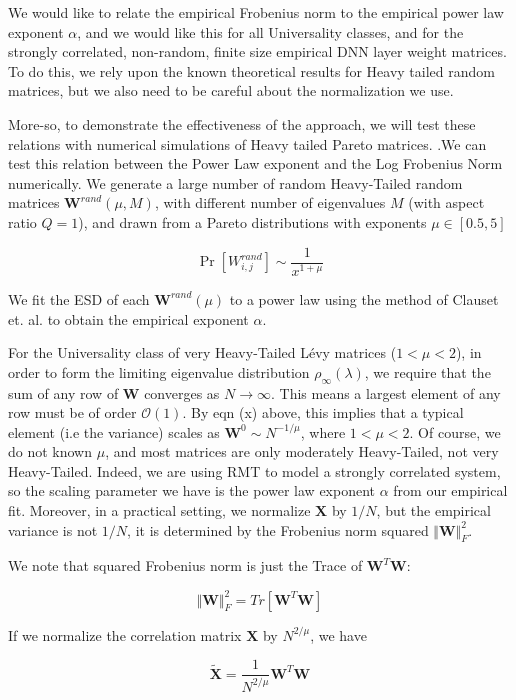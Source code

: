 We would like to relate the empirical Frobenius norm to the empirical power law exponent $\alpha$, and we would like this for all Universality classes,
and for the strongly correlated,  non-random, finite size empirical DNN layer weight matrices.  To do this, we rely upon the known theoretical
results for Heavy tailed random matrices, but we also need to be careful about the normalization we use.

More-so, to demonstrate the effectiveness of the approach, we will test these relations with numerical simulations of Heavy tailed Pareto matrices.
.We can test this relation between the Power Law exponent and the Log Frobenius Norm numerically.
We generate a large number of random Heavy-Tailed random matrices $\mathbf{W}^{rand}(\mu,M)$, 
with different number of eigenvalues $M$ (with aspect ratio $Q=1$), 
and drawn from a Pareto distributions with exponents $\mu\in[0.5, 5]$

$$\Pr[{W}^{rand}_{i,j}]\sim\dfrac{1}{x^{1+\mu}}$$

We fit the ESD of each $\mathbf{W}^{rand}(\mu)$ to a power law using the method of Clauset et. al. to obtain the empirical exponent $\alpha$.  


For the Universality class of very Heavy-Tailed L\'evy matrices ($1<\mu<2$), in order to form the limiting eigenvalue distribution $\rho_{\infty}(\lambda)$,
we require that the sum of any row of $\mathbf{W}$ converges as $N\rightarrow\infty$. This means a largest  element of any row
must be of order $\mathcal{O}(1)$.  By eqn (x) above, this implies that a typical element  (i.e the variance) scales as $\mathbf{W}^{0}\sim N^{-1/\mu}$, where $1<\mu<2$.
Of course, we do not known $\mu$, and most matrices are only moderately Heavy-Tailed, not very Heavy-Tailed.
Indeed, we are using RMT to model a strongly correlated system, so the scaling parameter
we have is the power law exponent $\alpha$ from our empirical fit.
Moreover, in a practical setting, we normalize $\mathbf{X}$ by $1/N$, but the empirical variance is not $1/N$, it is determined by the Frobenius norm squared
$\Vert\mathbf{W}\Vert^{2}_{F}$.   

We note that squared Frobenius norm is just the Trace of $\mathbf{W}^{T}\mathbf{W}$:

$$\Vert\mathbf{W}\Vert_{F}^{2}=Tr[\mathbf{W}^{T}\mathbf{W}]$$

If we normalize the correlation matrix $\mathbf{X}$ by $N^{2/\mu}$, we have

$$\tilde{\mathbf{X}}=\dfrac{1}{N^{2/\mu}}\mathbf{W}^{T}\mathbf{W}$$

